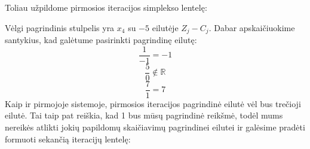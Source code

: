 \documentclass{article}
\begin{document}
Toliau užpildome pirmosios iteracijos simplekso lentelę:
\begin{table}[H]
    \centering
\end{table}
Vėlgi pagrindinis stulpelis yra $x_4$ su $-5$ eilutėje $Z_j-C_j$. Dabar apskaičiuokime santykius, kad galėtume pasirinkti pagrindinę eilutę:
\begin{equation*}
    \frac{1}{-1} = -1
\end{equation*}
\begin{equation*}
    \frac{5}{0} \not\in \mathbb{R}
\end{equation*}
\begin{equation*}
    \frac{7}{1} = 7
\end{equation*}
Kaip ir pirmojoje sistemoje, pirmosios iteracijos pagrindinė eilutė vėl bus trečioji eilutė. Tai taip pat reiškia, kad 1 bus mūsų pagrindinė reikšmė, todėl mums nereikės atlikti jokių papildomų skaičiavimų pagrindinei eilutei ir galėsime pradėti formuoti sekančią iteracijų lentelę:
\begin{table}[H]
    \centering
\end{table}
\end{document}
